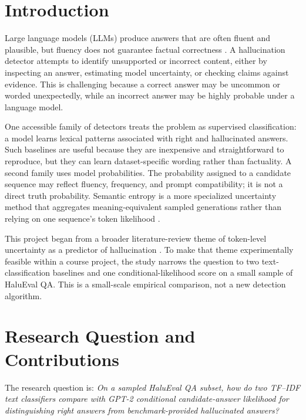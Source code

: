 \documentclass[acmsmall,nonacm]{acmart}
\begin{document}
\maketitle

\section{Introduction}
Large language models (LLMs) produce answers that are often fluent and plausible, but fluency does not guarantee factual correctness \citep{ji2023survey}. A hallucination detector attempts to identify unsupported or incorrect content, either by inspecting an answer, estimating model uncertainty, or checking claims against evidence. This is challenging because a correct answer may be uncommon or worded unexpectedly, while an incorrect answer may be highly probable under a language model.

One accessible family of detectors treats the problem as supervised classification: a model learns lexical patterns associated with right and hallucinated answers. Such baselines are useful because they are inexpensive and straightforward to reproduce, but they can learn dataset-specific wording rather than factuality. A second family uses model probabilities. The probability assigned to a candidate sequence may reflect fluency, frequency, and prompt compatibility; it is not a direct truth probability. Semantic entropy is a more specialized uncertainty method that aggregates meaning-equivalent sampled generations rather than relying on one sequence's token likelihood \citep{farquhar2024semantic, kuhn2023semantic}.

This project began from a broader literature-review theme of token-level uncertainty as a predictor of hallucination \citep{fadeeva2024factchecking}. To make that theme experimentally feasible within a course project, the study narrows the question to two text-classification baselines and one conditional-likelihood score on a small sample of HaluEval QA. This is a small-scale empirical comparison, not a new detection algorithm.

\section{Research Question and Contributions}
The research question is: \emph{On a sampled HaluEval QA subset, how do two TF--IDF text classifiers compare with GPT-2 conditional candidate-answer likelihood for distinguishing right answers from benchmark-provided hallucinated answers?}
\end{document}
